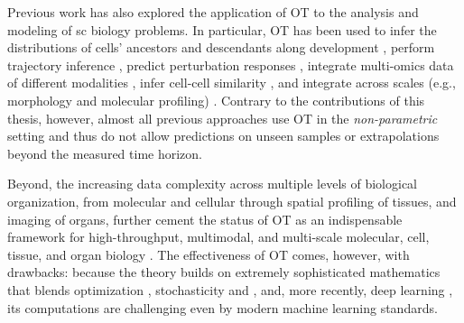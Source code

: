 Previous work has also explored the application of \acrlong{OT} to the analysis and modeling of \acrlong{sc} biology problems.
In particular, \acrshort{OT} has been used to infer the distributions of cells' ancestors and descendants along development \citep{schiebinger2019optimal}, perform trajectory inference \citep{bunne2022proximal, forrow2021lineageot, bunne2022recovering, lavenant2021towards, schiebinger2019optimal, tong2020trajectorynet, yang2020predicting, zhang2021optimal, chizat2022trajectory}, predict perturbation responses \citep{bunne2021learning, yang2018scalable, lubeck2022neural}, integrate multi-omics data of different modalities \citep{demetci2022scot}, infer cell-cell similarity \citep{huizing2022optimal}, and integrate across scales (e.g., morphology and molecular profiling) \citep{yang2021multi}. 
Contrary to the contributions of this thesis, however, almost all previous approaches use \acrshort{OT} in the \emph{non-parametric} setting and thus do not allow predictions on unseen samples or extrapolations beyond the measured time horizon.

Beyond, the increasing data complexity across multiple levels of biological organization, from molecular and cellular through spatial profiling of tissues, and imaging of organs, further cement the status of \acrshort{OT} as an indispensable framework for high-throughput, multimodal, and multi-scale molecular, cell, tissue, and organ biology \citep{moriel2021novosparc}. The effectiveness of \acrshort{OT} comes, however, with drawbacks: because the theory builds on extremely sophisticated mathematics that blends optimization \citep{cuturi2013sinkhorn, cuturi2022optimal}, stochasticity \citep{chizat2022trajectory, bunne2022recovering} and  \citep{bunne2022proximal}, and, more recently, deep learning \citep{tong2020trajectorynet, bunne2021learning, bunne2022supervised, yang2018scalable, lubeck2022neural, yang2021multi}, its computations are challenging even by modern machine learning standards.
